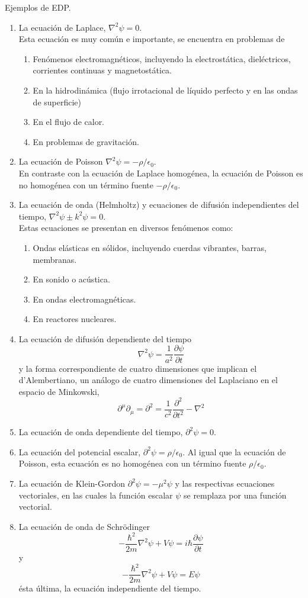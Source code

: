Ejemplos de EDP.
\begin{enumerate}
\item La ecuación de Laplace, $\nabla^{2} \psi = 0$. 
\\
Esta ecuación es muy común e importante, se encuentra en problemas de
\begin{enumerate}
\item Fenómenos electromagnéticos, incluyendo la electrostática, dieléctricos, corrientes continuas y magnetostática.
\item En la hidrodinámica (flujo irrotacional de líquido perfecto y en las ondas de superficie)
\item En el flujo de calor.
\item En problemas de gravitación.
\end{enumerate}
\item La ecuación de Poisson $\nabla^{2} \psi = - \rho / \epsilon_{0}$.
\\
En contraste con la ecuación de Laplace homogénea, la ecuación de Poisson es no homogénea con un término fuente $- \rho / \epsilon_{0}$.
\item La ecuación de onda (Helmholtz) y ecuaciones de difusión independientes del tiempo, $\nabla^{2} \psi \pm k^{2} \psi= 0$.
\\
Estas ecuaciones se presentan en diversos fenómenos como:
\begin{enumerate}
\item Ondas elásticas en sólidos, incluyendo cuerdas vibrantes, barras, membranas.
\item En sonido o acústica.
\item En ondas electromagnéticas.
\item En reactores nucleares.
\end{enumerate}
\item La ecuación de difusión dependiente del tiempo
\[ \nabla^{2} \psi = \dfrac{1}{a^{2}} \dfrac{\partial \psi}{\partial t} \]
y la forma correspondiente de cuatro dimensiones que implican el d'Alembertiano, un análogo de cuatro dimensiones del Laplaciano en el espacio de Minkowski,
\[ \partial^{\mu} \partial_{\mu} = \partial^{2} = \dfrac{1}{c^{2}} \dfrac{\partial^{2}}{\partial t^{2}} - \nabla^{2} \]
\item La ecuación de onda dependiente del tiempo, $\partial^{2} \psi = 0$.
\item La ecuación del potencial escalar, $\partial^{2} \psi = \rho / \epsilon_{0}$. Al igual que la ecuación de Poisson, esta ecuación es no homogénea con un término fuente $\rho / \epsilon_{0}$.
\item La ecuación de Klein-Gordon $\partial^{2} \psi = - \mu^{2} \psi$ y las respectivas ecuaciones vectoriales, en las cuales la función escalar $\psi$ se remplaza por una función vectorial.
\item La ecuación de onda de Schrödinger
\[ - \dfrac{\hbar^{2}}{2m} \nabla^{2} \psi +  V \psi =  i \hbar \dfrac{\partial \psi}{\partial t} \]
y
\[ - \dfrac{\hbar^{2}}{2m} \nabla^{2} \psi +  V \psi =  E \psi \]
ésta última, la ecuación independiente del tiempo.
\end{enumerate}
